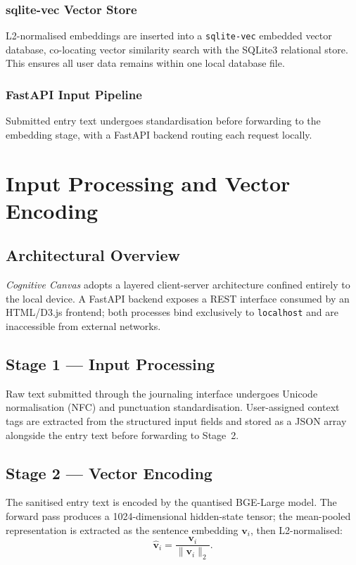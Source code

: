 \documentclass[12pt]{article}
\newcommand{\CC}{\textit{Cognitive Canvas}}
\begin{document}
\subsubsection{sqlite-vec Vector Store}
L2-normalised embeddings are inserted into a \texttt{sqlite-vec} embedded vector database, co-locating vector similarity search with the SQLite3 relational store. This ensures all user data remains within one local database file. 

\subsubsection{FastAPI Input Pipeline}
Submitted entry text undergoes standardisation before forwarding to the embedding stage, with a FastAPI backend routing each request locally.

\section{Input Processing and Vector Encoding}

\subsection{Architectural Overview}
\CC{} adopts a layered client-server architecture confined entirely to the local device. A FastAPI backend exposes a REST interface consumed by an HTML/D3.js frontend; both processes bind exclusively to \texttt{localhost} and are inaccessible from external networks.

\subsection{Stage 1 --- Input Processing}
Raw text submitted through the journaling interface undergoes Unicode normalisation (NFC) and punctuation standardisation. User-assigned context tags are extracted from the structured input fields and stored as a JSON array alongside the entry text before forwarding to Stage~2.

\subsection{Stage 2 --- Vector Encoding}
The sanitised entry text is encoded by the quantised BGE-Large model. The forward pass produces a 1024-dimensional hidden-state tensor; the mean-pooled representation is extracted as the sentence embedding $\mathbf{v}_i$, then L2-normalised:
\begin{equation}
\hat{\mathbf{v}}_i = \frac{\mathbf{v}_i}{\|\mathbf{v}_i\|_2}.
\label{eq:normalise}
\end{equation}
\end{document}
